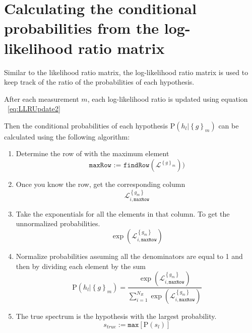 \section{Calculating the conditional probabilities from the log-likelihood ratio matrix}

Similar to the likelihood ratio matrix, the log-likelihood ratio matrix is used to keep track of the ratio of the probabilities of each hypothesis.

After each measurement $m$, each log-likelihood ratio is updated using equation ~\ref{eq:LLRUpdate2}

Then the conditional probabilities of each hypothesis $\mbox{P}(h_l | \left\{ g \right\}_m)$ can be calculated using the following algorithm:

\begin{enumerate}
    \item Determine the row of with the maximum element
    \begin{equation}
    \texttt{maxRow := } \texttt{findRow}(\pmb{\mathscr{L}}^{\left\{ g \right\}_m}))
    \end{equation}
    \item Once you know the row, get the corresponding column
    \begin{equation}
    \mathscr{L}_{i,\texttt{maxRow}}^{ \left\{ g_{m} \right\} }
    \end{equation}
    \item Take the exponentials for all the elements in that column. To get the unnormalized probabilities.
    \begin{equation}
    \exp ( \mathscr{L}_{i,\texttt{maxRow}}^{ \left\{g_{m} \right\} } )
    \end{equation}
    \item Normalize probabilities assuming all the denominators are equal to 1 and then by dividing each element by the sum
    \begin{equation}
    \mbox{P}(h_l | \left\{ g \right\}_m )
    =
    \frac
    {
        \exp ( \mathscr{L}_{i,\texttt{maxRow}}^{ \left\{g_{m} \right\} } )
    }
    {
        \sum_{i = 1}^{N_R} \exp ( \mathscr{L}_{i,\texttt{maxRow}}^{ \left\{g_{m} \right\} } )
    }
    \end{equation}
    \item The true spectrum is the hypothesis with the largest probability.
    \begin{equation}
        s_{true} := \texttt{max}\left[\mbox{P}(s_{l}) \right]
    \end{equation}
\end{enumerate}

